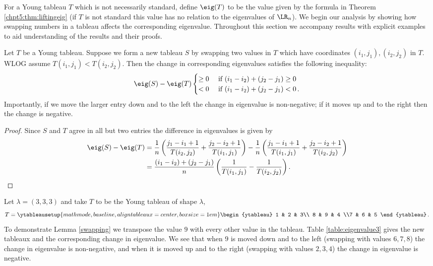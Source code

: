 \documentclass[11pt]{report}
\begin{document}
For a Young tableau $T$ which is not necessarily standard, define $\eig(T)$ 
to be the value given by the formula in Theorem \ref{chpt5:thm:liftingeig} (if $T$ 
is not 	standard this value has no relation to the eigenvalues of $\LR_{n}$). We  begin our analysis by showing how swapping numbers 
in a tableau affects the corresponding eigenvalue. Throughout this section 
we accompany results with explicit examples to aid understanding of the results and their proofs.

\begin{lemma}
	\label{swapping}
	Let  $T$ be a Young tableau. Suppose we form a new tableau $S$ by swapping 
	two values in $T$ which have coordinates $(i_{1},j_{1}),(i_{2},j_{2})$ in 
	$T$. WLOG assume  $T(i_{1},j_{1}) < 
	T(i_{2},j_{2})$. Then the change in corresponding eigenvalues satisfies the following inequality:
	\[\eig(S) - \eig(T) 
	\begin{cases}
	\geq 0 & \text{ if } (i_{1}-i_{2})+ (j_{2}-j_{1}) \geq 0\\
	< 0 & \text{ if }  (i_{1}-i_{2}) + (j_{2}-j_{1})<0\,.
	\end{cases}
	\]	
	Importantly, if we move the larger entry down and to the left the change 
	in eigenvalue is non-negative; if it moves up and to the right then the change is negative.
\end{lemma}

\begin{proof}
	Since $S$ and $T$ agree in all but two entries the difference in eigenvalues 
	is given by 
	\begin{align*}
	\eig(S) - \eig(T) &= \frac{1}{n}\left(\frac{j_{1}-i_{1}+1}{T(i_{2},j_{2})} + 
	\frac{j_{2}-i_{2}+1}{T(i_{1},j_{1})}\right) - 
	\frac{1}{n}\left(\frac{j_{1}-i_{1}+1}{T(i_{1},j_{1})} + 
	\frac{j_{2}-i_{2}+1}{T(i_{2},j_{2})}\right) \\
	&= \frac{(i_{1}-i_{2})+(j_{2}-j_{1})}{n} \left(\frac{1}{T(i_{1},j_{1})} - 
	\frac{1}{T(i_{2},j_{2})} 
	\right).\qedhere
	\end{align*}
\end{proof}


\begin{example}
	\label{chpt5:ex:swapingtableau}
	Let $\lambda = (3,3,3)$ and take $T$ to be the Young tableau of shape $\lambda$,
	\[T = \ytableausetup{mathmode,baseline,aligntableaux=center,boxsize=1em}
	\begin{ytableau} 1 & 2 & 3\\ 8 & 9 & 4 \\7 & 6 & 5
	\end{ytableau}  \, .\]
	To demonstrate Lemma \ref{swapping} we transpose the value $9$ with every other value in the tableau. Table \ref{table:eigenvalue3} gives the new tableaux and the corresponding change in eigenvalue.
	We see that when $9$ is moved down and to the left 
	(swapping with values $6,7,8$) the  change in eigenvalue is non-negative, and when it is moved up and to the right (swapping  with values $2,3,4$) the change in eigenvalue is negative. 
\end{example}
\end{document}
